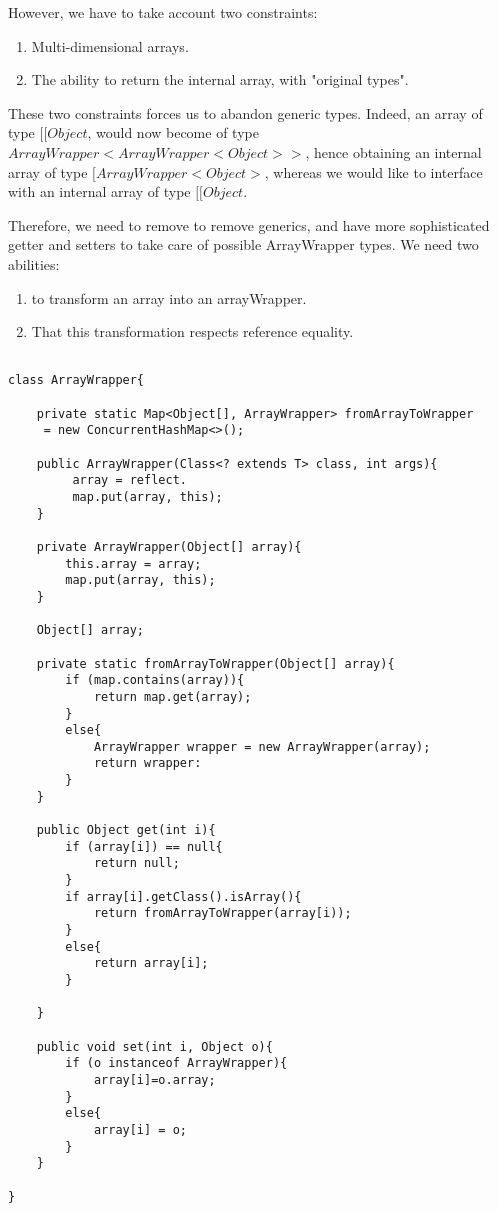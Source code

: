 \documentclass[a4paper, 11pt, english]{article}
\begin{document}
However, we have to take account two constraints:
\begin{enumerate}
\item Multi-dimensional arrays.
\item The ability to return the internal array, with "original types".
\end{enumerate}

These two constraints forces us to abandon generic types. Indeed, an array of type $[[Object$, would now become of type $ArrayWrapper<ArrayWrapper<Object>>$, hence obtaining an internal array of type $[ArrayWrapper<Object>$, whereas we would like to interface with an internal array of type $[[Object$. 

Therefore, we need to remove to remove generics, and have more sophisticated getter and setters to take care of possible ArrayWrapper types. We need two abilities:
\begin{enumerate}
\item to transform an array into an arrayWrapper.
\item That this transformation respects reference equality.
\end{enumerate}

\begin{lstlisting}

class ArrayWrapper{

	private static Map<Object[], ArrayWrapper> fromArrayToWrapper
	 = new ConcurrentHashMap<>();
	
	public ArrayWrapper(Class<? extends T> class, int args){
		 array = reflect.
		 map.put(array, this);		 
	}
	
	private ArrayWrapper(Object[] array){
		this.array = array;
		map.put(array, this);
	}
	
	Object[] array;
	
	private static fromArrayToWrapper(Object[] array){
		if (map.contains(array)){
			return map.get(array);		
		}
		else{
			ArrayWrapper wrapper = new ArrayWrapper(array);
			return wrapper:
		}
	}
	
	public Object get(int i){
		if (array[i]) == null{
			return null;	
		}
		if array[i].getClass().isArray(){
			return fromArrayToWrapper(array[i)); 		
		}
		else{
			return array[i];
		}
		
	}
	
	public void set(int i, Object o){
		if (o instanceof ArrayWrapper){
			array[i]=o.array;		
		}
		else{
			array[i] = o;
		}
	}

}
\end{lstlisting}
\end{document}
